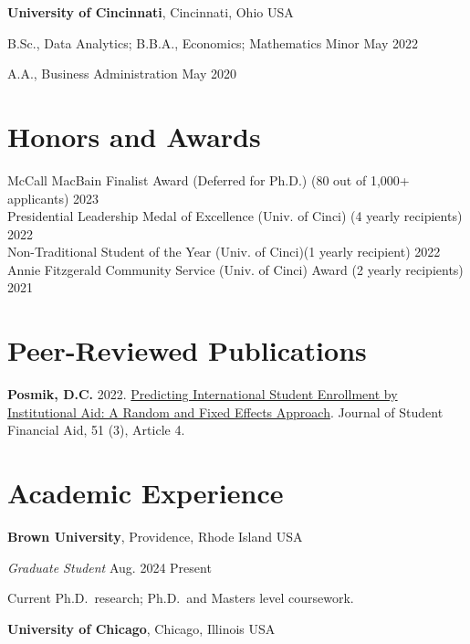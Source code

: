 \documentclass[margin,line]{res}
\newenvironment{list1}{
  \begin{list}{\ding{113}}{%
      \setlength{\itemsep}{0in}
      \setlength{\parsep}{0in} \setlength{\parskip}{0in}
      \setlength{\topsep}{0in} \setlength{\partopsep}{0in} 
      \setlength{\leftmargin}{0.17in}}}{\end{list}}
\begin{document}
\begin{resume}
{\bf University of Cincinnati}, Cincinnati, Ohio USA\\
\vspace*{-.15in}
\begin{list1}
\item[] B.Sc., Data Analytics; B.B.A., Economics; Mathematics Minor \hfill May 2022
\item[] A.A., Business Administration \hfill May 2020
\end{list1}


\section{\sc Honors and Awards} 
McCall MacBain Finalist Award (Deferred for Ph.D.) (80 out of 1,000+ applicants) \hfill 2023 \\  
Presidential Leadership Medal of Excellence (Univ. of Cinci) (4 yearly recipients) \hfill 2022 \\ 
Non-Traditional Student of the Year (Univ. of Cinci)(1 yearly recipient) \hfill 2022 \\
Annie Fitzgerald Community Service (Univ. of Cinci) Award (2 yearly recipients) \hfill 2021


\section{\sc Peer-Reviewed Publications}
{\bf Posmik, D.C.} 2022. \href{https://ir.library.louisville.edu/jsfa/vol51/iss3/4/}{Predicting International Student Enrollment by Institutional Aid: A Random and Fixed Effects Approach}. Journal of Student Financial Aid, 51 (3), Article 4.  


\section{\sc Academic Experience}
{\bf Brown University}, Providence, Rhode Island USA

\vspace{-.3cm}
{\em Graduate Student} \hfill {Aug. 2024{ \textemdash } Present} \\ 
\vspace{-.4cm}
\begin{list1}
\item[\cdot] Current Ph.D.~research; Ph.D.~and Masters level coursework. 
\end{list1}

{\bf University of Chicago}, Chicago, Illinois USA


\end{resume}
\end{document}

